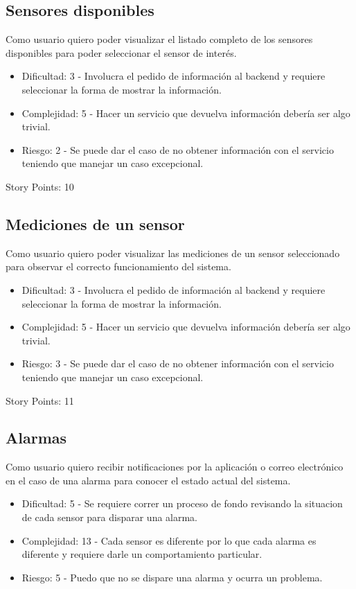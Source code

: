 \documentclass[
11pt, %
]{charter}
\begin{document}
\subsection{Sensores disponibles}
Como usuario quiero poder visualizar el listado completo de los sensores disponibles para poder seleccionar el sensor de interés.
\begin{itemize}
	\item Dificultad: 3 - Involucra el pedido de información al backend y requiere seleccionar la forma de mostrar la información.
	\item Complejidad: 5 - Hacer un servicio que devuelva información debería ser algo trivial.
	\item Riesgo: 2 - Se puede dar el caso de no obtener información con el servicio teniendo que manejar un caso excepcional.
\end{itemize}

Story Points: 10
\subsection{Mediciones de un sensor}
Como usuario quiero poder visualizar las mediciones de un sensor seleccionado para observar el correcto funcionamiento del sistema.
\begin{itemize}
	\item Dificultad: 3 - Involucra el pedido de información al backend y requiere seleccionar la forma de mostrar la información.
	\item Complejidad: 5 - Hacer un servicio que devuelva información debería ser algo trivial.
	\item Riesgo: 3 - Se puede dar el caso de no obtener información con el servicio teniendo que manejar un caso excepcional.
\end{itemize}

Story Points: 11
\subsection{Alarmas}
Como usuario quiero recibir notificaciones por la aplicación o correo electrónico en el caso de una alarma para conocer el estado actual del sistema.
\begin{itemize}
	\item Dificultad: 5 - Se requiere correr un proceso de fondo revisando la situacion de cada sensor para disparar una alarma.
	\item Complejidad: 13 - Cada sensor es diferente por lo que cada alarma es diferente y requiere darle un comportamiento particular.
	\item Riesgo: 5 - Puedo que no se dispare una alarma y ocurra un problema.
\end{itemize}
\end{document}
